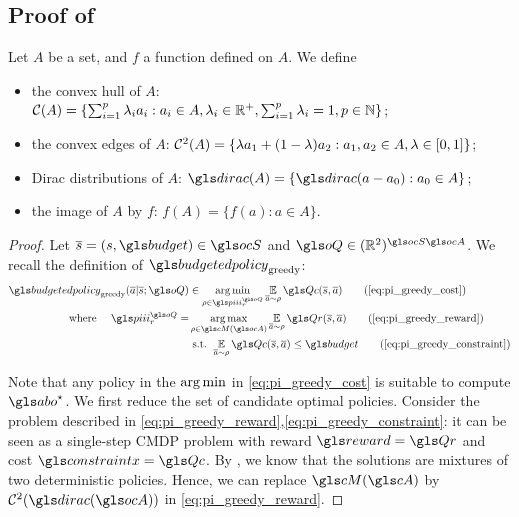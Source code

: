 \begin{subappendices}
\subsection{Proof of }
\label{sec:proof_pi_hull}
\begin{definition}
	\begin{leftbar}[defnbar]
	Let $A$ be a set, and $f$ a function defined on $A$. We define
	
	\begin{itemize}
		\item the convex hull of $A$: $\mathcal{C}(A) = \{\sum_{i=1}^p \lambda_i a_i: a_i\in A, \lambda_i\in\mathbb{R}^+, \sum_{i=1}^p \lambda_i = 1, p\in\mathbb{N}\}$;
		\item the convex edges of $A$: $\mathcal{C}^2(A) = \{\lambda a_1 + (1-\lambda)a_2: a_1, a_2\in A, \lambda\in[0, 1]\}$;
		\item Dirac distributions of $A$: $\dirac(A) = \{\dirac(a-a_0): a_0\in A\}$;
		\item the image of $A$ by $f$: $f(A) = \{f(a): a\in A\}$.
	\end{itemize}
\end{leftbar}
\end{definition}

\begin{proof}
Let $\os=(s,\budget)\in\ocS$ and $\oQ\in(\Real^2)^{\ocS\ocA}$. We recall the definition of $\budgetedpolicy_\text{greedy}$:
    \begin{subequations}
        \begin{align}
            \budgetedpolicy_\text{greedy}(\oa|\os; \oQ) &\in \argmin_{\rho\in\policies_r^{\oQ}} \expectedvalueover{\oa\sim\rho}\Qc(\os, \oa) \tag{\ref{eq:pi_greedy_cost}}\\
            \text{where }\quad\policies_r^{\oQ} = &\argmax_{\rho\in\cM(\ocA)} \expectedvalueover{\oa\sim\rho} \Qr(\os, \oa) \tag{\ref{eq:pi_greedy_reward}}\\
            & \text{ s.t. }  \expectedvalueover{\oa\sim\rho} \Qc(\os, \oa) \leq \budget \tag{\ref{eq:pi_greedy_constraint}}
        \end{align}
    \end{subequations}

    Note that any policy in the $\operatorname*{arg\,min}$ in \eqref{eq:pi_greedy_cost} is suitable to compute $\abo^{\star}$.
    We first reduce the set of candidate optimal policies.
    Consider the problem described in \eqref{eq:pi_greedy_reward},\eqref{eq:pi_greedy_constraint}: it can be seen as a single-step \gls{CMDP} problem with reward $\reward=\Qr$ and cost $\constraint=\Qc$. By \citep[Theorem 4.4][]{Beutler1985}, we know that the solutions are mixtures of two deterministic policies. Hence, we can replace $\cM(\cA)$ by $\cC^2(\dirac(\ocA))$ in \eqref{eq:pi_greedy_reward}.


\end{proof}
\end{subappendices}
